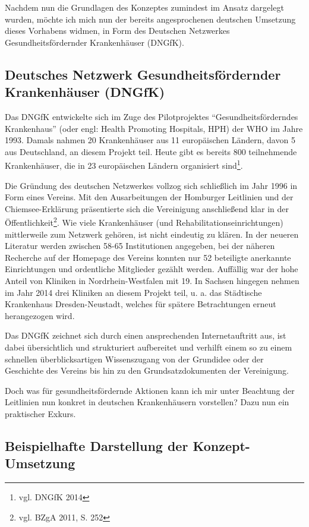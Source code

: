 Nachdem nun die Grundlagen des Konzeptes zumindest im Ansatz dargelegt wurden, möchte ich mich nun der bereits angesprochenen deutschen Umsetzung dieses Vorhabens widmen, in Form des Deutschen Netzwerkes Gesundheitsfördernder Krankenhäuser (DNGfK).

\subsection{Deutsches Netzwerk Gesundheitsfördernder Krankenhäuser (DNGfK)}
\label{sec:DeutschesNetzwerkGesundheitsfördernderKrankenhäuserDNGfK}

Das DNGfK entwickelte sich im Zuge des Pilotprojektes "`Gesundheitsförderndes Krankenhaus"' (oder engl: Health Promoting Hospitals, HPH) der WHO im Jahre 1993. Damals nahmen 20 Krankenhäuser aus 11 europäischen Ländern, davon 5 aus Deutschland, an diesem Projekt teil. Heute gibt es bereits 800 teilnehmende Krankenhäuser, die in 23 europäischen Ländern organisiert sind\footnote{vgl. DNGfK 2014}.

Die Gründung des deutschen Netzwerkes vollzog sich schließlich im Jahr 1996 in Form eines Vereins. Mit den Ausarbeitungen der Homburger Leitlinien und der Chiemsee-Erklärung präsentierte sich die Vereinigung anschließend klar in der Öffentlichkeit\footnote{vgl. BZgA 2011, S. 252}. Wie viele Krankenhäuser (und Rehabilitationseinrichtungen) mittlerweile zum Netzwerk gehören, ist nicht eindeutig zu klären. In der neueren Literatur werden zwischen 58-65 Institutionen angegeben, bei der näheren Recherche auf der Homepage des Vereins konnten nur 52 beteiligte anerkannte Einrichtungen und ordentliche Mitglieder gezählt werden. Auffällig war der hohe Anteil von Kliniken in Nordrhein-Westfalen mit 19. In Sachsen hingegen nehmen im Jahr 2014 drei Kliniken an diesem Projekt teil, u. a. das Städtische Krankenhaus Dresden-Neustadt, welches für spätere Betrachtungen erneut herangezogen wird.

Das DNGfK zeichnet sich durch einen ansprechenden Internetauftritt aus, ist dabei übersichtlich und strukturiert aufbereitet und verhilft einem so zu einem schnellen überblicksartigen Wissenszugang von der Grundidee oder der Geschichte des Vereins bis hin zu den Grundsatzdokumenten der Vereinigung.

Doch was für gesundheitsfördernde Aktionen kann ich mir unter Beachtung der Leitlinien nun konkret in deutschen Krankenhäusern vorstellen? Dazu nun ein praktischer Exkurs.

\subsection{Beispielhafte Darstellung der Konzept-Umsetzung}
\label{sec:BeispielhafteDarstellungDerKonzeptUmsetzung}

